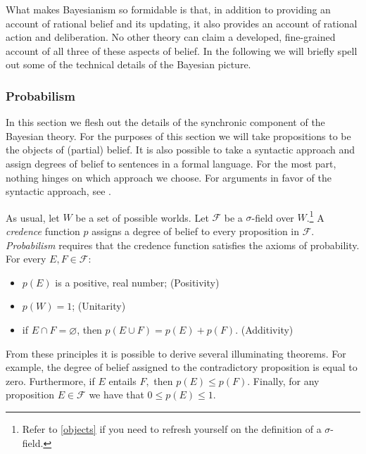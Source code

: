 What makes Bayesianism so formidable is that, in addition to providing an
account of rational belief and its updating, it also provides an account of
rational action and deliberation. No other theory can claim a developed,
fine-grained account of all three of these aspects of belief. In the following
we will briefly spell out some of the technical details of the Bayesian picture.



\subsubsection{Probabilism}

In this section we flesh out the details of the synchronic component of the
Bayesian theory. For the purposes of this section we will take propositions to
be the objects of (partial) belief. It is also possible to take a syntactic
approach and assign degrees of belief to sentences in a formal language. For the
most part, nothing hinges on which approach we choose. For arguments in favor of
the syntactic approach, see \citet{weisberg2011varieties}. 

As usual, let $W$ be a set of possible worlds. Let $\mathcal{F}$ be a
$\sigma$-field over $W$.\footnote{Refer to \autoref{objects} if you need to
refresh yourself on the definition of a $\sigma$-field.} A {\em credence}
function $p$ assigns a degree of belief to every proposition in $\mathcal{F}$.
{\em Probabilism} requires that the credence function satisfies the axioms of
probability. For every $E,F \in \mathcal{F}$: 
\begin{itemize}
\item[] $p(E)$ is a positive, real number; \hfill (Positivity)
\item[] $p(W)=1$; \hfill (Unitarity)
\item[] if $E\cap F= \varnothing$, then $p(E\cup F)=p(E)+p(F)$. \hfill
(Additivity)
\end{itemize}
From these principles it is possible to derive several illuminating theorems.
For example, the degree of belief assigned to the contradictory proposition is
equal to zero. Furthermore, if $E$ entails $F,$ then $p(E)\leq p(F)$. Finally,
for any proposition $E\in\mathcal{F}$ we have that $0\leq p(E)\leq 1.$

